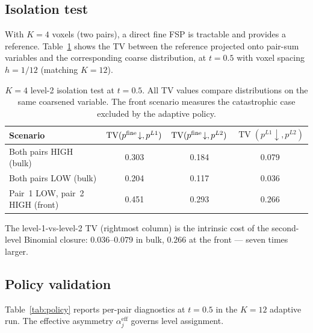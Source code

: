\documentclass[11pt]{article}
\newcommand{\TV}{\operatorname{TV}}
\begin{document}
\subsection{Isolation test}

With $K=4$ voxels (two pairs), a direct fine FSP is tractable and provides a
reference.  Table~\ref{tab:isolation} shows the TV between the reference
projected onto pair-sum variables and the corresponding coarse distribution, at
$t=0.5$ with voxel spacing $h=1/12$ (matching $K=12$).

\begin{table}[ht]
\centering
\caption{$K=4$ level-2 isolation test at $t=0.5$.  All TV values compare
distributions on the same coarsened variable. The front scenario measures the
catastrophic case excluded by the adaptive policy.}
\label{tab:isolation}
\begin{tabular}{lccc}
\toprule
Scenario & $\TV(p^{\rm fine}\!\downarrow, p^{L1})$ &
           $\TV(p^{\rm fine}\!\downarrow, p^{L2})$ &
           $\TV(p^{L1}\!\downarrow, p^{L2})$ \\
\midrule
Both pairs HIGH (bulk)          & 0.303 & 0.184 & 0.079 \\
Both pairs LOW  (bulk)          & 0.204 & 0.117 & 0.036 \\
Pair~1 LOW, pair~2 HIGH (front) & 0.451 & 0.293 & 0.266 \\
\bottomrule
\end{tabular}
\end{table}

The level-1-vs-level-2 TV (rightmost column) is the intrinsic cost of the
second-level Binomial closure: $0.036$--$0.079$ in bulk, $0.266$ at the front
--- seven times larger.

\subsection{Policy validation}

Table~\ref{tab:policy} reports per-pair diagnostics at $t=0.5$ in the $K=12$
adaptive run.  The effective asymmetry $\alpha_j^{\mathrm{eff}}$ governs level
assignment.
\end{document}
